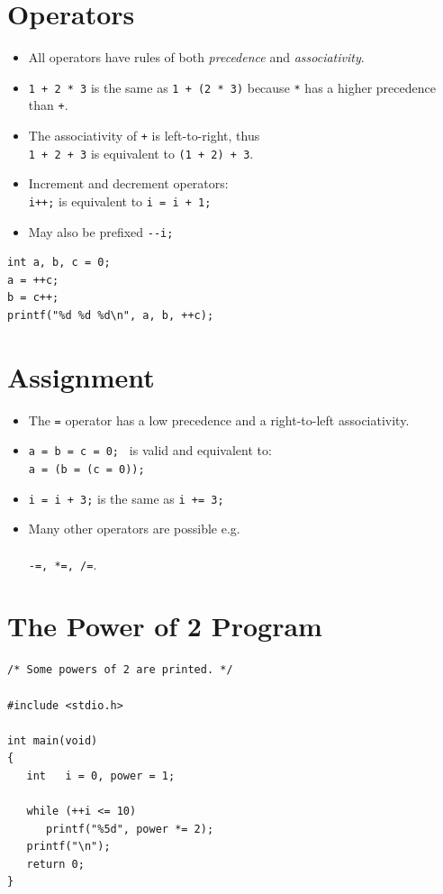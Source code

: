 \documentclass[a4,portraitt]{slides}
\begin{document}
\section*{Operators}

\begin{itemize}
\item All operators have rules of both {\it precedence}
and {\it associativity}.
\item  \verb^1 + 2 * 3^ is the same as
\verb^1 + (2 * 3)^ because \verb^*^ has
a higher precedence than \verb^+^.
\item  The associativity of \verb^+^ is left-to-right, thus\\
\verb^1 + 2 + 3^ is equivalent to
\verb^(1 + 2) + 3^.
\item  Increment and decrement operators:\\
\verb^i++;^ is equivalent to \verb^i = i + 1;^
\item  May also be prefixed \verb^--i;^
\end{itemize}
\begin{verbatim}
int a, b, c = 0;
a = ++c;
b = c++;
printf("%d %d %d\n", a, b, ++c);
\end{verbatim}

\section*{Assignment}

\begin{itemize}
\item  The \verb^=^ operator has a low precedence
and a right-to-left associativity.
\item  \verb^a = b = c = 0; ^ is valid and equivalent to:\\
\verb^a = (b = (c = 0));^
\item  \verb^i = i + 3;^ is the same as \verb^i += 3;^
\item  Many other operators are possible e.g.\\\\ \verb^-=, *=, /=^.
\end{itemize}

\newpage
\section*{The Power of 2 Program}



\begin{verbatim}
/* Some powers of 2 are printed. */

#include <stdio.h>

int main(void)
{
   int   i = 0, power = 1;

   while (++i <= 10)
      printf("%5d", power *= 2);
   printf("\n");
   return 0;
}
\end{verbatim}
\end{document}
